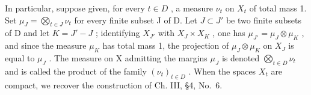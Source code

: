 In particular, suppose given, for every \(t \in D\) , a measure \(\nu_{t}\) on \(X_{t}\) of total mass 1. Set \(\mu_{J} = \bigotimes_{t \in J} \nu_{t}\) for every finite subset J of D. Let \(J \subset J'\) be two finite subsets of D and let \(K = J' - J\) ; identifying \(X_{J'}\) with \(X_{J} \times X_{K}\) , one has \(\mu_{J'} = \mu_{J} \otimes \mu_{K}\) , and since the measure \(\mu_{K}\) has total mass 1, the projection of \(\mu_{J} \otimes \mu_{K}\) on \(X_{J}\) is equal to \(\mu_{J}\) . The measure on X admitting the margins \(\mu_{J}\) is denoted \(\bigotimes_{t \in D} \nu_{t}\) and is called the product of the family \((\nu_{t})_{t \in D}\) . When the spaces \(X_{t}\) are compact, we recover the construction of Ch. III, §4, No.~6.


